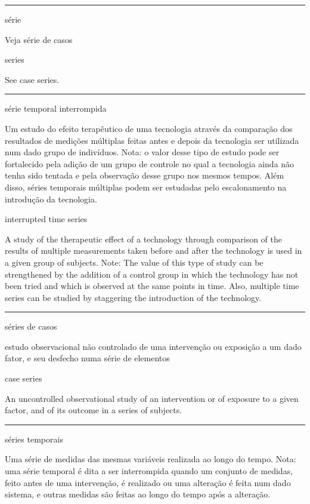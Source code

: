 \documentclass[
]{book}
\begin{document}
\begin{center}\rule{0.5\linewidth}{0.5pt}\end{center}

série

Veja série de casos

series

See case series.

\begin{center}\rule{0.5\linewidth}{0.5pt}\end{center}

série temporal interrompida

Um estudo do efeito terapêutico de uma tecnologia através da comparação dos resultados de medições múltiplas feitas antes e depois da tecnologia ser utilizada num dado grupo de indivíduos. Nota: o valor desse tipo de estudo pode ser fortalecido pela adição de um grupo de controle no qual a tecnologia ainda não tenha sido tentada e pela observação desse grupo nos mesmos tempos. Além disso, séries temporais múltiplas podem ser estudadas pelo escalonamento na introdução da tecnologia.

interrupted time series

A study of the therapeutic effect of a technology through comparison of the results of multiple measurements taken before and after the technology is used in a given group of subjects. Note: The value of this type of study can be strengthened by the addition of a control group in which the technology has not been tried and which is observed at the same points in time. Also, multiple time series can be studied by staggering the introduction of the technology.

\begin{center}\rule{0.5\linewidth}{0.5pt}\end{center}

séries de casos

estudo observacional não controlado de uma intervenção ou exposição a um dado fator, e seu desfecho numa série de elementos

case series

An uncontrolled observational study of an intervention or of exposure to a given factor, and of its outcome in a series of subjects.

\begin{center}\rule{0.5\linewidth}{0.5pt}\end{center}

séries temporais

Uma série de medidas das mesmas variáveis realizada ao longo do tempo. Nota: uma série temporal é dita a ser interrompida quando um conjunto de medidas, feito antes de uma intervenção, é realizado ou uma alteração é feita num dado sistema, e outras medidas são feitas ao longo do tempo após a alteração.
\end{document}
